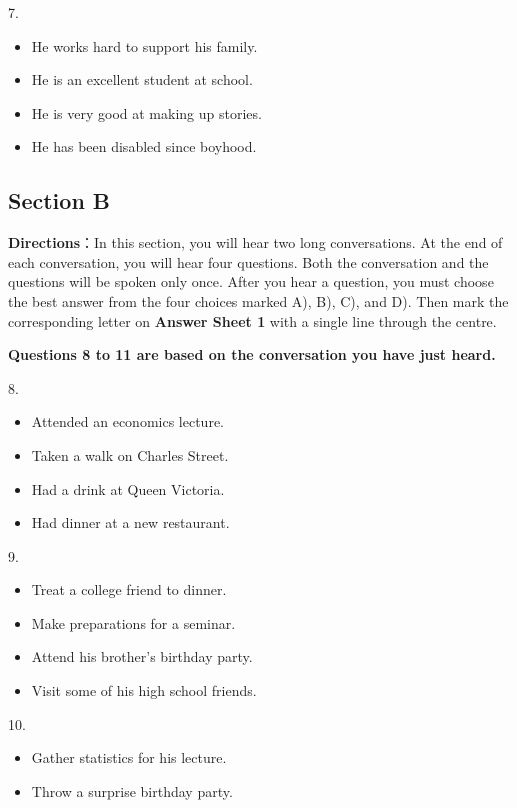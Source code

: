 \documentclass[UTF8,11pt]{ctexart}
\begin{document}
7.


\begin{itemize}[leftmargin=2em,itemsep=.2em,topsep=.4em]\item[A.] He works hard to support his family.
\item[B.] He is an excellent student at school.
\item[C.] He is very good at making up stories.
\item[D.] He has been disabled since boyhood.
\end{itemize}

\subsection*{\textbf{Section B}}


\textbf{Directions}：In this section, you will hear two long conversations. At the end of each conversation, you will hear four questions. Both the conversation and the questions will be spoken only once. After you hear a question, you must choose the best answer from the four choices marked A), B), C), and D). Then mark the corresponding letter on\textbf{ Answer Sheet 1} with a single line through the centre.


\textbf{Questions 8 to 11 are based on the conversation you have just heard.}


8.


\begin{itemize}[leftmargin=2em,itemsep=.2em,topsep=.4em]\item[A.] Attended an economics lecture.
\item[B.] Taken a walk on Charles Street.
\item[C.] Had a drink at Queen Victoria.
\item[D.] Had dinner at a new restaurant.
\end{itemize}

9.


\begin{itemize}[leftmargin=2em,itemsep=.2em,topsep=.4em]\item[A.] Treat a college friend to dinner.
\item[B.] Make preparations for a seminar.
\item[C.] Attend his brother’s birthday party.
\item[D.] Visit some of his high school friends.
\end{itemize}

10.


\begin{itemize}[leftmargin=2em,itemsep=.2em,topsep=.4em]\item[A.] Gather statistics for his lecture.
\item[B.] Throw a surprise birthday party.
\end{itemize}
\end{document}
